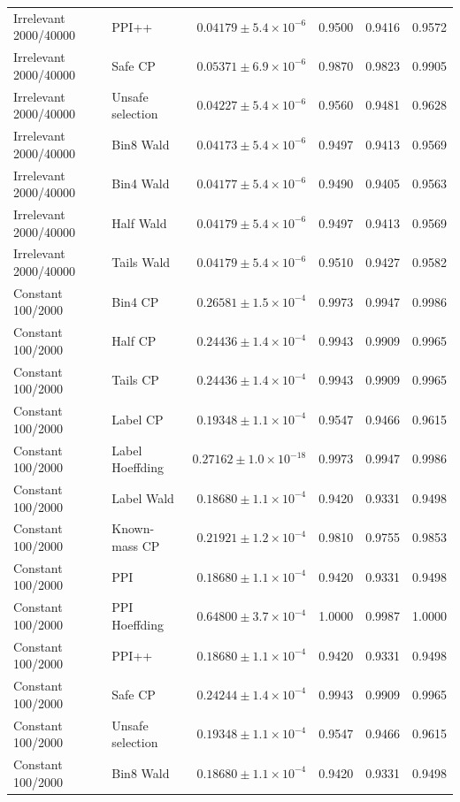 \begin{longtable}{llrrrr}
Irrelevant 2000/40000 & PPI++ & $0.04179\pm 5.4\times 10^{-6}$ & 0.9500 & 0.9416 & 0.9572 \\
Irrelevant 2000/40000 & Safe CP & $0.05371\pm 6.9\times 10^{-6}$ & 0.9870 & 0.9823 & 0.9905 \\
Irrelevant 2000/40000 & Unsafe selection & $0.04227\pm 5.4\times 10^{-6}$ & 0.9560 & 0.9481 & 0.9628 \\
Irrelevant 2000/40000 & Bin8 Wald & $0.04173\pm 5.4\times 10^{-6}$ & 0.9497 & 0.9413 & 0.9569 \\
Irrelevant 2000/40000 & Bin4 Wald & $0.04177\pm 5.4\times 10^{-6}$ & 0.9490 & 0.9405 & 0.9563 \\
Irrelevant 2000/40000 & Half Wald & $0.04179\pm 5.4\times 10^{-6}$ & 0.9497 & 0.9413 & 0.9569 \\
Irrelevant 2000/40000 & Tails Wald & $0.04179\pm 5.4\times 10^{-6}$ & 0.9510 & 0.9427 & 0.9582 \\
Constant 100/2000 & Bin4 CP & $0.26581\pm 1.5\times 10^{-4}$ & 0.9973 & 0.9947 & 0.9986 \\
Constant 100/2000 & Half CP & $0.24436\pm 1.4\times 10^{-4}$ & 0.9943 & 0.9909 & 0.9965 \\
Constant 100/2000 & Tails CP & $0.24436\pm 1.4\times 10^{-4}$ & 0.9943 & 0.9909 & 0.9965 \\
Constant 100/2000 & Label CP & $0.19348\pm 1.1\times 10^{-4}$ & 0.9547 & 0.9466 & 0.9615 \\
Constant 100/2000 & Label Hoeffding & $0.27162\pm 1.0\times 10^{-18}$ & 0.9973 & 0.9947 & 0.9986 \\
Constant 100/2000 & Label Wald & $0.18680\pm 1.1\times 10^{-4}$ & 0.9420 & 0.9331 & 0.9498 \\
Constant 100/2000 & Known-mass CP & $0.21921\pm 1.2\times 10^{-4}$ & 0.9810 & 0.9755 & 0.9853 \\
Constant 100/2000 & PPI & $0.18680\pm 1.1\times 10^{-4}$ & 0.9420 & 0.9331 & 0.9498 \\
Constant 100/2000 & PPI Hoeffding & $0.64800\pm 3.7\times 10^{-4}$ & 1.0000 & 0.9987 & 1.0000 \\
Constant 100/2000 & PPI++ & $0.18680\pm 1.1\times 10^{-4}$ & 0.9420 & 0.9331 & 0.9498 \\
Constant 100/2000 & Safe CP & $0.24244\pm 1.4\times 10^{-4}$ & 0.9943 & 0.9909 & 0.9965 \\
Constant 100/2000 & Unsafe selection & $0.19348\pm 1.1\times 10^{-4}$ & 0.9547 & 0.9466 & 0.9615 \\
Constant 100/2000 & Bin8 Wald & $0.18680\pm 1.1\times 10^{-4}$ & 0.9420 & 0.9331 & 0.9498 \\

\end{longtable}
